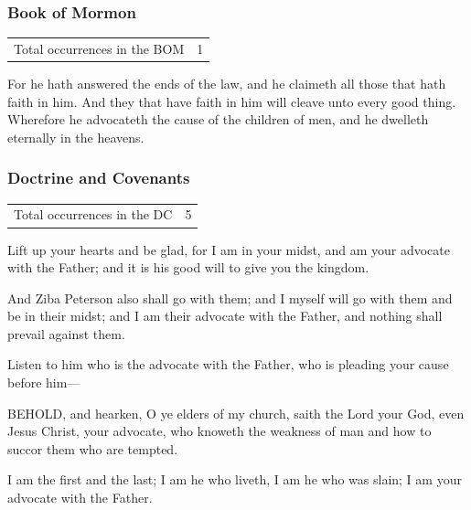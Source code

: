 		
	\subsubsection{Book of Mormon} %
		\label{ADVOCATE-BOM}
	
		\begin{tabular}{ll}
			Total occurrences in the BOM & 1
		\end{tabular}
		
		\begin{compactdesc}
			\item[{\hyperref[MORONI-7-28]{Moroni 7:28}}] For he hath answered the ends of the law, and he claimeth all those that hath faith in him. And they that have faith in him will cleave unto every good thing. Wherefore he advocateth the cause of the children of men, and he dwelleth eternally in the heavens. 
		\end{compactdesc}
		
	\subsubsection{Doctrine and Covenants} %
		\label{ADVOCATE-DC}
	
		\begin{tabular}{ll}
			Total occurrences in the DC & 5
		\end{tabular}
		
		\begin{compactdesc}
			\item[{\hyperref[DC29-5]{DC 29:5}}] Lift up your hearts and be glad, for I am in your midst, and am your advocate with the Father; and it is his good will to give you the kingdom.
			\item[{\hyperref[DC32-3]{DC 32:3}}] And Ziba Peterson also shall go with them; and I myself will go with them and be in their midst; and I am their advocate with the Father, and nothing shall prevail against them.
			\item[{\hyperref[DC45-3]{DC 45:3}}] Listen to him who is the advocate with the Father, who is pleading your cause before him---
			\item[{\hyperref[DC62-1]{DC 62:1}}] BEHOLD, and hearken, O ye elders of my church, saith the Lord your God, even Jesus Christ, your advocate, who knoweth the weakness of man and how to succor them who are tempted.
			\item[{\hyperref[DC110-4]{DC 110:4}}] I am the first and the last; I am he who liveth, I am he who was slain; I am your advocate with the Father.
		\end{compactdesc}
		
